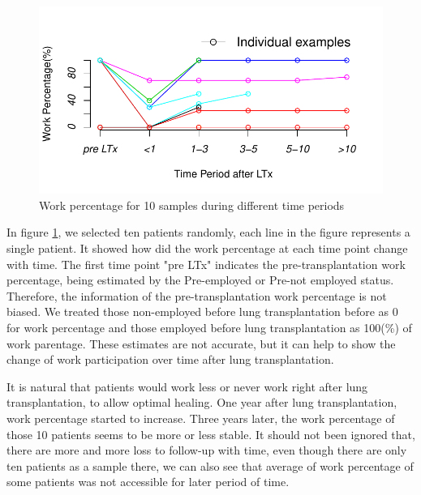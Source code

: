 \documentclass[11pt, a4paper]{article}\usepackage[]{graphicx}\usepackage[]{color}
\makeatletter
\def\maxwidth{ %
  \ifdim\Gin@nat@width>\linewidth
    \linewidth
  \else
    \Gin@nat@width
  \fi
}
\newenvironment{knitrout}{}{} %
\makeatother
\begin{document}
\begin{figure}[ht]
\centering
\begin{knitrout}
\color{fgcolor}
\includegraphics[width=\maxwidth]{plots/ptenperc-1} 

\end{knitrout}
\caption{Work percentage for 10 samples during different time periods} \label{fig:fig6}
\end{figure}

In figure \ref{fig:fig6}, we selected ten patients randomly, each line in the figure represents a single patient. It showed how did the work percentage at each time point change with time. The first time point "pre LTx" indicates the pre-transplantation work percentage, being estimated by the Pre-employed or Pre-not employed status. Therefore, the information of the pre-transplantation work percentage is not biased. We treated those non-employed before lung transplantation before as 0 for work percentage and those employed before lung transplantation as 100(\%) of work parentage. These estimates are not accurate, but it can help to show the change of work participation over time after lung transplantation.

It is natural that patients would work less or never work right after lung transplantation, to allow optimal healing. One year after lung transplantation, work percentage started to increase. Three years later, the work percentage of those 10 patients seems to be more or less stable. It should not been ignored that, there are more and more loss to follow-up with time, even though there are only ten patients as a sample there, we can also see that average of work percentage of some patients was not accessible for later period of time.
\clearpage
\end{document}
